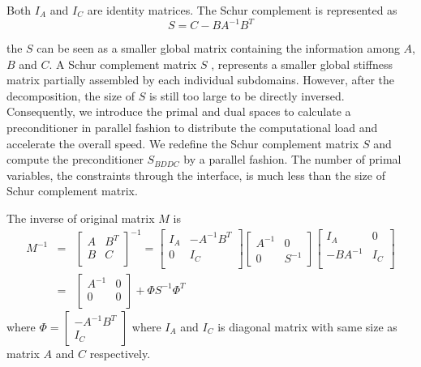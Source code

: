 Both $ I_{A} $ and $ I_{C} $ are identity matrices. The Schur complement is represented as
\begin{equation}
\mathit{S} = C - BA^{-1} B^{T}
\end{equation}

the $ S $ can be seen as a smaller global matrix containing the information among $ A $, $ B $ and $ C $. A Schur complement matrix $ S $ , represents a smaller global stiffness matrix partially assembled by each individual subdomains. However, after the decomposition, the size of $ S $ is still too large to be directly inversed. Consequently, we introduce the primal and dual spaces to calculate a preconditioner in parallel fashion to distribute the computational load and accelerate the overall speed. We redefine the Schur complement matrix $ S $ and compute the preconditioner $ S_{BDDC} $ by a parallel fashion. The number of primal variables, the constraints through the interface, is much less than the size of Schur complement matrix.

The inverse of original matrix $ M $ is 
\begin{eqnarray} \label{eq:schur}
M^{-1} &=& \begin{bmatrix}
A & B^{T} \\
B & C\\
\end{bmatrix}^{-1} =
\begin{bmatrix}
I_{A} &  -A^{-1}B^{T} \\ 0 & I_{C}\\
\end{bmatrix} \begin{bmatrix}
A^{-1}& 0 \\ 0 & S^{-1}
\end{bmatrix}
\begin{bmatrix}
I_{A} & 0 \\ -BA^{-1} & I_{C} \\
\end{bmatrix}\\
&=& \begin{bmatrix}
A^{-1} & 0 \\ 0 & 0 \\
\end{bmatrix} + \Phi S^{-1} \Phi^{T}
\end{eqnarray}
where $ \Phi =\begin{bmatrix}
-A^{-1}B^{T} \\ I_{C}
\end{bmatrix} $
where $ I_{A} $ and $ I_{C} $ is diagonal matrix with same size as matrix $ A $ and $ C $ respectively.

